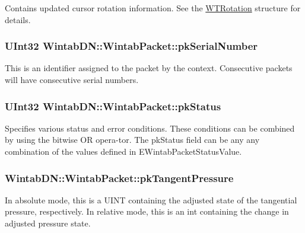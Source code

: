 Contains updated cursor rotation information. See the \hyperlink{struct_wintab_d_n_1_1_w_t_rotation}{WTRotation} structure for details. 

\hypertarget{struct_wintab_d_n_1_1_wintab_packet_a10550807dd2a1cd432c2ff3c271bd3ea}{
\subsubsection[{pkSerialNumber}]{\setlength{\rightskip}{0pt plus 5cm}UInt32 {\bf WintabDN::WintabPacket::pkSerialNumber}}}
\label{struct_wintab_d_n_1_1_wintab_packet_a10550807dd2a1cd432c2ff3c271bd3ea}


This is an identifier assigned to the packet by the context. Consecutive packets will have consecutive serial numbers. 

\hypertarget{struct_wintab_d_n_1_1_wintab_packet_a2f16f395c9f61bd40038a1029ec62912}{
\subsubsection[{pkStatus}]{\setlength{\rightskip}{0pt plus 5cm}UInt32 {\bf WintabDN::WintabPacket::pkStatus}}}
\label{struct_wintab_d_n_1_1_wintab_packet_a2f16f395c9f61bd40038a1029ec62912}


Specifies various status and error conditions. These conditions can be combined by using the bitwise OR opera-\/tor. The pkStatus field can be any any combination of the values defined in EWintabPacketStatusValue. 

\hypertarget{struct_wintab_d_n_1_1_wintab_packet_a182789bf6e328c9ae904daa31ccade5f}{
\subsubsection[{pkTangentPressure}]{ {\bf WintabDN::WintabPacket::pkTangentPressure}}}
\label{struct_wintab_d_n_1_1_wintab_packet_a182789bf6e328c9ae904daa31ccade5f}


In absolute mode, this is a UINT containing the adjusted state of the tangential pressure, respectively. In relative mode, this is an int containing the change in adjusted pressure state. 

